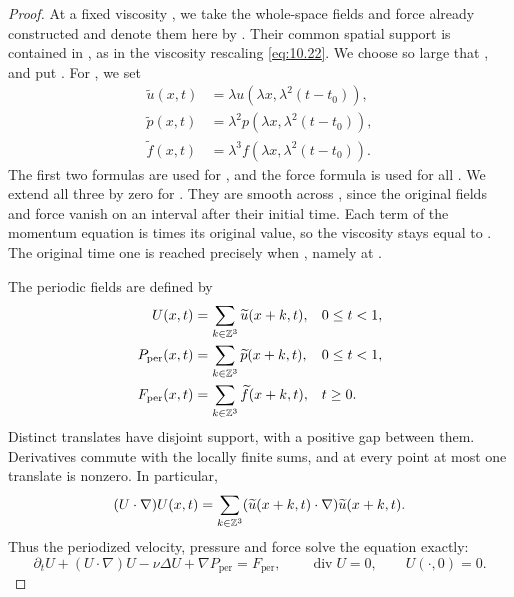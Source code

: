 \begin{proof}
At a fixed viscosity , we take the whole-space fields and force
already constructed and denote them here by . Their common
spatial support is contained in , as in the
viscosity rescaling \eqref{eq:10.22}. We choose  so large
that , and put
. For , we set
\[
\begin{aligned}
  \widetilde u(x,t)&=\lambda u(\lambda x,\lambda^2(t-t_0)),\\
  \widetilde p(x,t)&=\lambda^2p(\lambda x,\lambda^2(t-t_0)),\\
  \widetilde f(x,t)&=\lambda^3f(\lambda x,\lambda^2(t-t_0)).
\end{aligned}
\]
The first two formulas are used for , and the force formula is
used for all . We extend all three by zero for
. They are smooth across
, since the original fields and force vanish on an interval
after their initial time. Each term of the momentum equation is
 times its original value, so the viscosity stays equal
to . The original time one is reached precisely when
, namely at .

The periodic fields are defined by
\[
\begin{aligned}
  U(x,t)&=\sum_{k\in\mathbb{Z}^3}\widetilde u(x+k,t),&&0\leq t<1,\\
  P_{\mathrm{per}}(x,t)&=\sum_{k\in\mathbb{Z}^3}\widetilde p(x+k,t),&&0\leq t<1,\\
  F_{\mathrm{per}}(x,t)&=\sum_{k\in\mathbb{Z}^3}\widetilde f(x+k,t),&&t\geq0.
\end{aligned}
\]
Distinct translates have disjoint support, with a positive gap between them. Derivatives
commute with the locally finite sums, and at every point at most one translate is nonzero.
In particular,
\[
  (U\cdot\nabla)U(x,t)
  =\sum_{k\in\mathbb{Z}^3}(\widetilde u(x+k,t)\cdot\nabla)\widetilde u(x+k,t).
\]
Thus the periodized velocity, pressure and force solve the equation exactly:
\[
  \partial_tU+(U\cdot\nabla)U-\nu\Delta U+\nabla P_{\mathrm{per}}
  =F_{\mathrm{per}},\qquad
  \operatorname{div}U=0,\qquad U(\cdot,0)=0.
\]


\end{proof}
